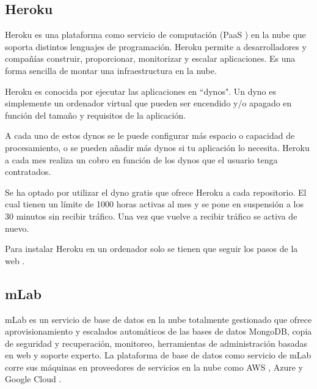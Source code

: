 

\subsection{ Heroku }

Heroku es una plataforma como servicio de computación (PaaS \cite{URL::PaaS}) en la nube que soporta distintos lenguajes de programación. Heroku permite a desarrolladores y compañías construir, proporcionar, monitorizar y escalar aplicaciones. Es una forma sencilla de montar una infraestructura en la nube.

Heroku es conocida por ejecutar las aplicaciones en ``dynos". Un dyno es simplemente un ordenador virtual que pueden ser encendido y/o apagado en función del tamaño y requisitos de la aplicación.

A cada uno de estos dynos se le puede configurar más espacio o capacidad de procesamiento, o se pueden añadir más dynos si tu aplicación lo necesita. Heroku a cada mes realiza un cobro en función de los dynos que el usuario tenga contratados. 

Se ha optado por utilizar el dyno gratis que ofrece Heroku a cada repositorio. El cual tienen un límite de 1000 horas activas al mes y se pone en suspensión a los 30 minutos sin recibir tráfico. Una vez que vuelve a recibir tráfico se activa de nuevo.    

Para instalar Heroku en un ordenador solo se tienen que seguir los pasos de la web \cite{URL::HerokuCLI}.


\subsection{ mLab }

mLab es un servicio de base de datos en la nube totalmente gestionado que ofrece aprovisionamiento y escalados automáticos de las bases de datos MongoDB, copia de seguridad y recuperación, monitoreo, herramientas de administración basadas en web y soporte experto. La plataforma de base de datos como servicio de mLab corre sus máquinas en proveedores de servicios en la nube como AWS \cite{URL::aws}, Azure \cite{URL::Azure} y Google Cloud \cite{URL::GoogleCloud}.

